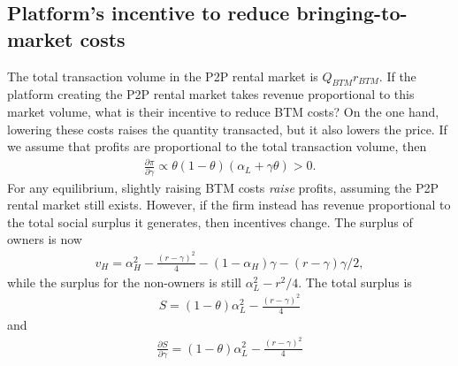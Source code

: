 \subsection{Platform's incentive to reduce bringing-to-market costs}
The total transaction volume in the P2P rental market is $Q_{BTM} r_{BTM}$.
If the platform creating the P2P rental market takes revenue proportional to this market volume, what is their incentive to reduce BTM costs?
On the one hand, lowering these costs raises the quantity transacted, but it also lowers the price.
If we assume that profits are proportional to the total transaction volume, then 
\begin{align}
  \frac{\partial \pi}{\partial \gamma} \propto \theta(1-\theta)(\alpha_L + \gamma \theta) > 0. 
\end{align}
For any equilibrium, slightly raising BTM costs \emph{raise} profits, assuming the P2P rental market still exists.
However, if the firm instead has revenue proportional to the total social surplus it generates, then incentives change. 
The surplus of owners is now
\begin{align}
  v_H = \alpha_H^2 - \frac{(r-\gamma)^2}{4} - (1 - \alpha_H)\gamma - (r-\gamma)\gamma/2, 
\end{align}
while the surplus for the non-owners is still $\alpha_L^2 - r^2/4$. 
The total surplus is
\begin{align}
  S = (1 - \theta)\alpha_L^2 - \frac{(r - \gamma)^2}{4}
\end{align} 
and
\begin{align}
  \frac{\partial S}{\partial \gamma} = (1 - \theta)\alpha_L^2 - \frac{(r - \gamma)^2}{4}
\end{align} 
